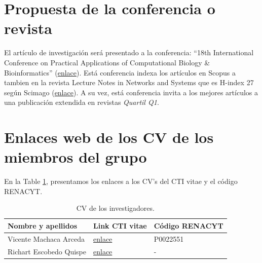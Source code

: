 \documentclass[a4paper]{article}
\begin{document}
\section{Propuesta de la conferencia o revista}

El artículo de investigación será presentado a la conferencia: ``18th International Conference on Practical Applications of Computational Biology \& Bioinformatics'' (\href{https://www.pacbb.net/}{enlace}). Está conferencia indexa los artículos en Scopus a tambien en la revista Lecture Notes in Networks and Systems que es H-index 27 según Scimago (\href{https://www.scimagojr.com/journalsearch.php?q=21100901469&tip=sid&clean=0}{enlace}). A su vez, está conferencia invita a los mejores artículos a una publicación extendida en revistas \textit{Quartil Q1}.


\section{Enlaces web de los CV de los miembros del grupo }

En la Table \ref{tab:inve}, presentamos los enlaces a los CV's del CTI vitae y el código RENACYT.

\begin{table}[H]
\centering
\caption{CV de los investigadores.}
\label{tab:inve}
\begin{tabular}{lll}
\textbf{Nombre y apellidos} & \textbf{Link CTI vitae}                                                                      & \textbf{Código RENACYT} \\ \hline
Vicente Machaca Arceda      & \href{https://dina.concytec.gob.pe/appDirectorioCTI/VerDatosInvestigador.do?id\_investigador=22551}{enlace} & P0022551                \\
Richart Escobedo Quispe     & \href{https://dina.concytec.gob.pe/appDirectorioCTI/VerDatosInvestigador.do?id\_investigador=20597}{enlace} & -     \\ \hline                 
\end{tabular}
\end{table}


	
\end{document}

